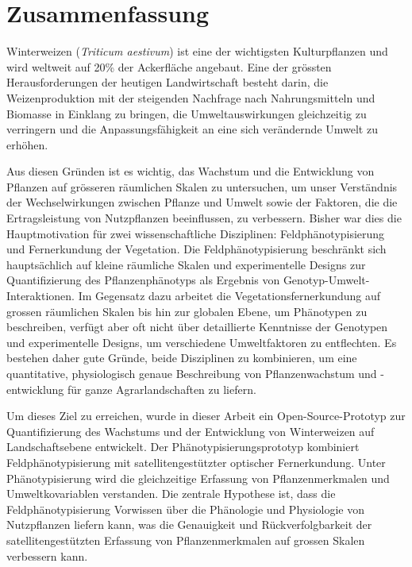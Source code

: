 \chapter*{Zusammenfassung}

Winterweizen (\textsl{Triticum aestivum}) ist eine der wichtigsten Kulturpflanzen und wird weltweit auf 20\% der Ackerfläche angebaut. Eine der grössten Herausforderungen der heutigen Landwirtschaft besteht darin, die Weizenproduktion mit der steigenden Nachfrage nach Nahrungsmitteln und Biomasse in Einklang zu bringen, die Umweltauswirkungen gleichzeitig zu verringern und die Anpassungsfähigkeit an eine sich verändernde Umwelt zu erhöhen.

Aus diesen Gründen ist es wichtig, das Wachstum und die Entwicklung von Pflanzen auf grösseren räumlichen Skalen zu untersuchen, um unser Verständnis der Wechselwirkungen zwischen Pflanze und Umwelt sowie der Faktoren, die die Ertragsleistung von Nutzpflanzen beeinflussen, zu verbessern. Bisher war dies die Hauptmotivation für zwei wissenschaftliche Disziplinen: Feldphänotypisierung und Fernerkundung der Vegetation. Die Feldphänotypisierung beschränkt sich hauptsächlich auf kleine räumliche Skalen und experimentelle Designs zur Quantifizierung des Pflanzenphänotyps als Ergebnis von Genotyp-Umwelt-Interaktionen. Im Gegensatz dazu arbeitet die Vegetationsfernerkundung auf grossen räumlichen Skalen bis hin zur globalen Ebene, um Phänotypen zu beschreiben, verfügt aber oft nicht über detaillierte Kenntnisse der Genotypen und experimentelle Designs, um verschiedene Umweltfaktoren zu entflechten. Es bestehen daher gute Gründe, beide Disziplinen zu kombinieren, um eine quantitative, physiologisch genaue Beschreibung von Pflanzenwachstum und -entwicklung für ganze Agrarlandschaften zu liefern.

Um dieses Ziel zu erreichen, wurde in dieser Arbeit ein Open-Source-Prototyp zur Quantifizierung des Wachstums und der Entwicklung von Winterweizen auf Landschaftsebene entwickelt. Der Phänotypisierungsprototyp kombiniert Feldphänotypisierung mit satellitengestützter optischer Fernerkundung. Unter Phänotypisierung wird die gleichzeitige Erfassung von Pflanzenmerkmalen und Umweltkovariablen verstanden. Die zentrale Hypothese ist, dass die Feldphänotypisierung Vorwissen über die Phänologie und Physiologie von Nutzpflanzen liefern kann, was die Genauigkeit und Rückverfolgbarkeit der satellitengestützten Erfassung von Pflanzenmerkmalen auf grossen Skalen verbessern kann.

